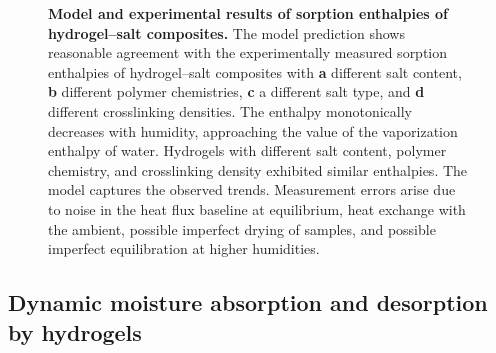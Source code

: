 \documentclass[11pt]{article}
\begin{document}
\begin{figure}[t]
\centering
{}
\caption{\textbf{Model and experimental results of sorption enthalpies of hydrogel--salt composites.} The model prediction shows reasonable agreement with the experimentally measured sorption enthalpies of hydrogel--salt composites with \textbf{a} different salt content, \textbf{b} different polymer chemistries, \textbf{c} a different salt type, and \textbf{d} different crosslinking densities. The enthalpy monotonically decreases with humidity, approaching the value of the vaporization enthalpy of water. Hydrogels with different salt content, polymer chemistry, and crosslinking density exhibited similar enthalpies. The model captures the observed trends. Measurement errors arise due to noise in the heat flux baseline at equilibrium, heat exchange with the ambient, possible imperfect drying of samples, and possible imperfect equilibration at higher humidities.}
\label{fig:fig4}
\end{figure}

\subsection{Dynamic moisture absorption and desorption by hydrogels}
\end{document}
